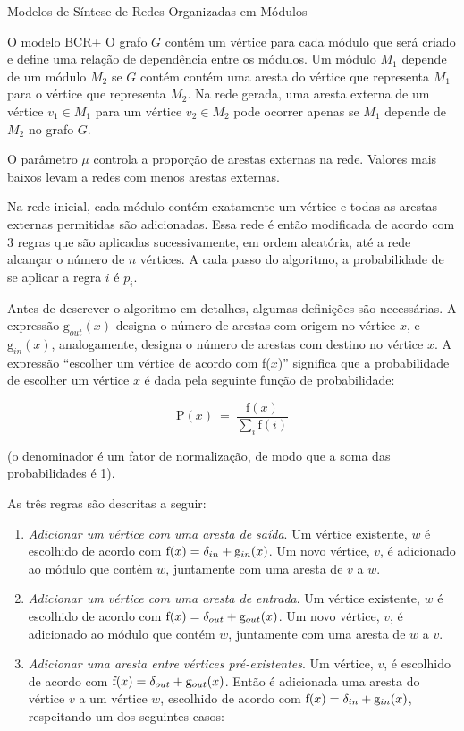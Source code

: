 \begin{section}{Modelos de Síntese de Redes Organizadas em Módulos}
\begin{subsection}{O modelo BCR+}
O grafo $G$ contém um vértice para cada módulo que será criado e define uma relação de dependência entre os módulos. Um módulo $M_1$ depende de um módulo $M_2$ se $G$ contém contém uma aresta do vértice que representa $M_1$ para o vértice que representa $M_2$. Na rede gerada, uma aresta externa de um vértice $v_1 \in M_1$ para um vértice $v_2 \in M_2$ pode ocorrer apenas se $M_1$ depende de $M_2$ no grafo $G$.

O parâmetro $\mu$ controla a proporção de arestas externas na rede. Valores mais baixos levam a redes com menos arestas externas.

Na rede inicial, cada módulo contém exatamente um vértice e todas as arestas externas permitidas são adicionadas. Essa rede é então modificada de acordo com 3 regras que são aplicadas sucessivamente, em ordem aleatória, até a rede alcançar o número de $n$ vértices. A cada passo do algoritmo, a probabilidade de se aplicar a regra $i$ é $p_i$.

Antes de descrever o algoritmo em detalhes, algumas definições são necessárias. A expressão $\mathrm{g}_{out}(x)$ designa o número de arestas com origem no vértice $x$, e $\mathrm{g}_{in}(x)$, analogamente, designa o número de arestas com destino no vértice $x$. A expressão ``escolher um vértice de acordo com f($x$)'' significa que a probabilidade de escolher um vértice $x$ é dada pela seguinte função de probabilidade:

$$
  \mathrm{P}(x) ~=~ \frac{ \mathrm{f}(x) }
  { \displaystyle\sum_{i} \mathrm{f}(i) }
$$

(o denominador é um fator de normalização, de modo que a soma das probabilidades é 1).

As três regras são descritas a seguir:

\begin{enumerate}

\item \emph{Adicionar um vértice com uma aresta de saída}. Um vértice existente, $w$ é escolhido de acordo com $\mathrm{f}(x) = \delta_{in} + \mathrm{g}_{in}(x)$. Um novo vértice, $v$, é adicionado ao módulo que contém $w$, juntamente com uma aresta de $v$ a $w$.

\item \emph{Adicionar um vértice com uma aresta de entrada}. Um vértice existente, $w$ é escolhido de acordo com $\mathrm{f}(x) = \delta_{out} + \mathrm{g}_{out}(x)$. Um novo vértice, $v$, é adicionado ao módulo que contém $w$, juntamente com uma aresta de $w$ a $v$.

\item \emph{Adicionar uma aresta entre vértices pré-existentes}. Um vértice, $v$, é escolhido de acordo com $\mathrm{f}(x) = \delta_{out} + \mathrm{g}_{out}(x)$. Então é adicionada uma aresta do vértice $v$ a um vértice $w$, escolhido de acordo com $\mathrm{f}(x) = \delta_{in} + \mathrm{g}_{in}(x)$, respeitando um dos seguintes casos:


\end{enumerate}
\end{subsection}
\end{section}
